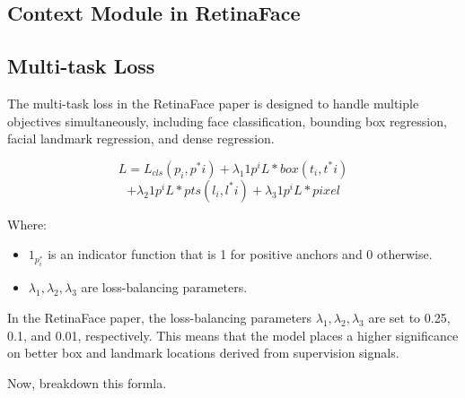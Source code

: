 \documentclass{article}
\begin{document}
\subsection{Context Module in RetinaFace}

\subsection{Multi-task Loss}

The multi-task loss in the RetinaFace paper is designed to handle multiple objectives simultaneously, including face classification, bounding box regression, facial landmark regression, and dense regression.

\[ L = L_{cls}(p_i, p^*i) + \lambda_1 1{p^i} L*{box}(t_i, t^*i) \]
\[+ \lambda_2 1{p^i} L*{pts}(l_i, l^*i) + \lambda_3 1{p^i} L*{pixel} \]

Where:

\begin{itemize}
\item \( 1_{p^*_i} \) is an indicator function that is 1 for positive anchors and 0 otherwise.
\item \( \lambda_1, \lambda_2, \lambda_3 \) are loss-balancing parameters.
\end{itemize}

In the RetinaFace paper, the loss-balancing parameters \( \lambda_1, \lambda_2, \lambda_3 \) are set to 0.25, 0.1, and 0.01, respectively. This means that the model places a higher significance on better box and landmark locations derived from supervision signals.

Now, breakdown this formla.
\end{document}
